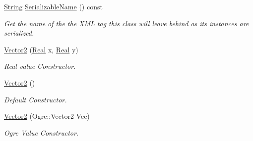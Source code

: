 \begin{DoxyCompactItemize}
\hyperlink{namespacephys_aa03900411993de7fbfec4789bc1d392e}{String} \hyperlink{classphys_1_1Vector2_aa7cef5fd3e8415378b3812b0309aa269}{SerializableName} () const 
\begin{DoxyCompactList}\small\item\em Get the name of the the XML tag this class will leave behind as its instances are serialized. \item\end{DoxyCompactList}\item 
\hyperlink{classphys_1_1Vector2_ae8d3c95a5a60d12e706739cbadf01ffb}{Vector2} (\hyperlink{namespacephys_af7eb897198d265b8e868f45240230d5f}{Real} x, \hyperlink{namespacephys_af7eb897198d265b8e868f45240230d5f}{Real} y)
\begin{DoxyCompactList}\small\item\em Real value Constructor. \item\end{DoxyCompactList}\item 
\hyperlink{classphys_1_1Vector2_a1e9c6000e5acd162a49836414a27bac7}{Vector2} ()
\begin{DoxyCompactList}\small\item\em Default Constructor. \item\end{DoxyCompactList}\item 
\hyperlink{classphys_1_1Vector2_af3dbb91ef994e19b68c84e4e26eafac3}{Vector2} (Ogre::Vector2 Vec)
\begin{DoxyCompactList}\small\item\em Ogre Value Constructor. \item\end{DoxyCompactList}\end{DoxyCompactItemize}
